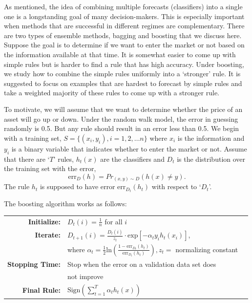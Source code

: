 As mentioned,\label{in:bagging}\label{in:boost1} the idea of combining multiple forecasts (classifiers) into a single one is a longstanding goal of many decision-makers. This is especially important when methods that are successful in different regimes are complementary. There are two types of ensemble methods, bagging and boosting that we discuss here. Suppose the goal is to determine if we want to enter the market or not based on the information available at that time. It is somewhat easier to come up with simple rules but is harder to find a rule that has high accuracy. Under boosting, we study how to combine the simple rules uniformly into a `stronger' rule. It is suggested to focus on examples that are hardest to forecast by simple rules and take a weighted majority of these rules to come up with a stronger rule.


To motivate, we will assume that we want to determine whether the price of an asset will go up or down. Under the random walk model, the error in guessing randomly is 0.5. But any rule should result in an error less than 0.5. We begin with a training set, $S=\{ (x_i,y_i), i=1,2, \ldots n\}$ where $x_i$ is the information and $y_i$ is a binary variable that indicates whether to enter the market or not. Assume that there are `$T$' rules, $h_t(x)$ are the classifiers and $D_t$ is the distribution over the training set with the error,
	\begin{equation}
	\text{err}_D(h)=Pr_{(x,y) \sim D}(h(x) \neq y).
	\end{equation}
The rule $h_t$ is supposed to have error $\text{err}_{D_t}(h_t)$ with respect to `$D_t$'. \twomedskip


\noindent The boosting algorithm works as follows:

        \begin{table}[!ht]
        \begin{tabular}{r l r}
        \textbf{Initialize:} & $D_t(i)=\frac{1}{n}$ for all $i$  \\
        \textbf{Iterate:} & $D_{t+1}(i)=\frac{D_t(i)}{z_t} \cdot \text{exp}[-\alpha_t y_i h_t(x_i)]$, \\
        & where $\alpha_t=\frac{1}{2}\text{ln} \left( \frac{1-\text{err}_{D_t}(h_t)}{\text{err}_{D_t}(h_t)} \right), z_t=$ normalizing constant \\
        \textbf{Stopping Time:} & Stop when the error on a validation data set does \\
        & not improve \\
        \textbf{Final Rule:} & $\text{Sign}(\sum_{t=1}^T \alpha_t h_t(x))$  \\
        \end{tabular}
        \end{table}
 
